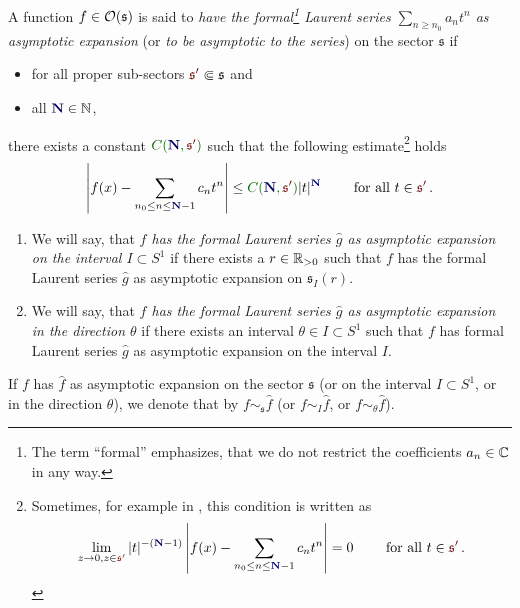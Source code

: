 \begin{defn}
  \def\myN{\textbf{\textcolor{blue!40!black}{N}}}
  \def\mySect{\textcolor{red!40!black}{\mathfrak{s}'}}
  \def\myConst{\textcolor{green!40!black}{C(\myN,\mySect)}}
  A function $f\in\mathcal{O}(\mathfrak{s})$ is said to \emph{have the
  formal\footnote{The term ``formal'' emphasizes, that we do not restrict the
  coefficients $a_n\in\mathbb{C}$ in any way.} Laurent series $\sum_{n\geq n_0}a_nt^n$
  as asymptotic expansion} (or \emph{to be asymptotic to the series}) on the
  sector $\mathfrak{s}$  if
  \begin{itemize}
    \item for all proper sub-sectors $\mySect\Subset\mathfrak{s}$ and
    \item all $\myN\in\N$,
  \end{itemize}
  there exists a constant
  $\myConst$ such that the following estimate\footnote{Sometimes, for example
    in \cite{sabbah_cimpa90}, this condition is written as
    \[
      \lim_{z\to0,z\in{\mySect}}
      |t|^{-(\myN-1)}
      \left|
        f(x)-\sum_{n_0\leq n\leq \myN-1}c_nt^n
      \right|=0
      \qquad \text{ for all } t\in \mySect \,.
    \]} holds
  \[
    \left|
      f(x)-\sum_{n_0\leq n\leq \myN-1}c_nt^n
    \right|
    \leq \myConst|t|^{\myN} \qquad \text{ for all }t\in \mySect \,.
  \]
  \begin{enumerate}
    \item We will say, that \emph{$f$ has the formal Laurent series $\hat g$ as
      asymptotic expansion on the interval $I\subset S^1$} if there exists a
      $r\in\mathbb{R}_{>0}$ such that $f$ has the formal Laurent series $\hat g$ as
      asymptotic expansion on $\mathfrak{s}_I(r)$.
    \item We will say, that \emph{$f$ has the formal Laurent series $\hat g$ as
      asymptotic expansion in the direction $\theta$} if there exists an
      interval $\theta\in I\subset S^1$ such that $f$ has formal Laurent series
      $\hat g$ as asymptotic expansion on the interval $I$.
  \end{enumerate}
\end{defn}
If $f$ has $\hat f$ as asymptotic expansion on the sector $\mathfrak{s}$ (or on
the interval $I\subset S^1$, or in the direction $\theta$), we denote that by
$f\sim_{\mathfrak{s}}\hat f$ (or $f\sim_{I}\hat f$, or
$f\sim_{\theta}\hat f$).\label{page:notationForAsymptoticExpansion}
